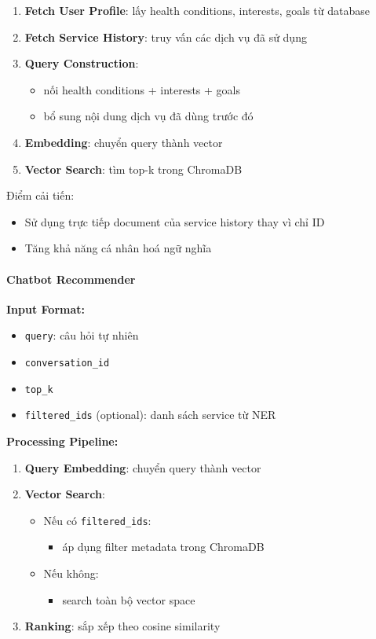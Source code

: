 \begin{enumerate}
    \item \textbf{Fetch User Profile}: lấy health conditions, interests, goals từ database
    \item \textbf{Fetch Service History}: truy vấn các dịch vụ đã sử dụng
    \item \textbf{Query Construction}:
    \begin{itemize}
        \item nối health conditions + interests + goals
        \item bổ sung nội dung dịch vụ đã dùng trước đó
    \end{itemize}
    \item \textbf{Embedding}: chuyển query thành vector
    \item \textbf{Vector Search}: tìm top-k trong ChromaDB
\end{enumerate}

Điểm cải tiến:
\begin{itemize}
    \item Sử dụng trực tiếp document của service history thay vì chỉ ID
    \item Tăng khả năng cá nhân hoá ngữ nghĩa
\end{itemize}

\paragraph{Chatbot Recommender}  

\textbf{Input Format:}
\begin{itemize}
    \item \texttt{query}: câu hỏi tự nhiên
    \item \texttt{conversation\_id}
    \item \texttt{top\_k}
    \item \texttt{filtered\_ids} (optional): danh sách service từ NER
\end{itemize}

\textbf{Processing Pipeline:}

\begin{enumerate}
    \item \textbf{Query Embedding}: chuyển query thành vector
    \item \textbf{Vector Search}:
    \begin{itemize}
        \item Nếu có \texttt{filtered\_ids}:
        \begin{itemize}
            \item áp dụng filter metadata trong ChromaDB
        \end{itemize}
        \item Nếu không:
        \begin{itemize}
            \item search toàn bộ vector space
        \end{itemize}
    \end{itemize}
    \item \textbf{Ranking}: sắp xếp theo cosine similarity
\end{enumerate}

